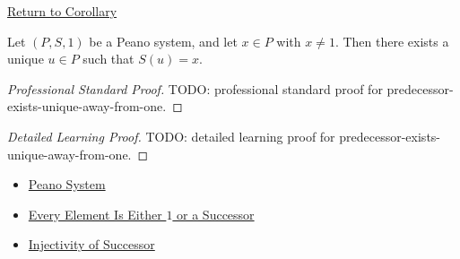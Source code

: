 \newpage
{}
\label{prf:predecessor-exists-unique-away-from-one}

\begin{remark*}[Return]
\hyperref[cor:predecessor-exists-unique-away-from-one]{Return to Corollary}
\end{remark*}

\begin{corollary*}
Let $(P,S,1)$ be a Peano system, and let $x \in P$ with $x \neq 1$. Then
there exists a unique $u \in P$ such that $S(u)=x$.
\end{corollary*}

\begin{proof}[Professional Standard Proof]
\LRAProofBodyStart
TODO: professional standard proof for predecessor-exists-unique-away-from-one.
\end{proof}

\begin{proof}[Detailed Learning Proof]
\LRAProofBodyStart
TODO: detailed learning proof for predecessor-exists-unique-away-from-one.
\end{proof}

\begin{remark*}
\end{remark*}

\begin{dependencies}
\begin{itemize}
  \item \hyperref[def:peano-system]{Peano System}
  \item \hyperref[thm:every-element-is-one-or-a-successor]{Every Element Is Either $1$ or a Successor}
  \item \hyperref[ax:peano-successor-injective]{Injectivity of Successor}
\end{itemize}
\end{dependencies}


\clearpage

